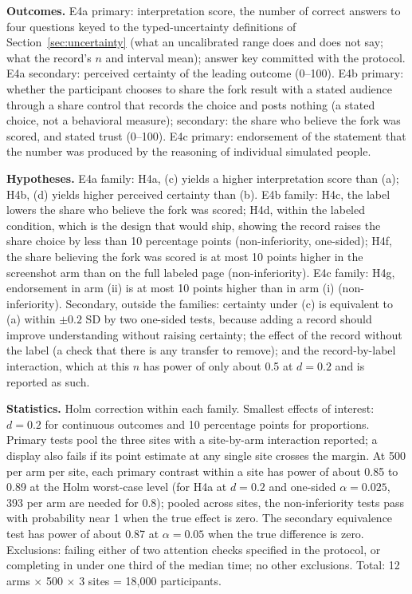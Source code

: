 \documentclass[11pt]{article}
\begin{document}
\textbf{Outcomes.} E4a primary: interpretation score, the number of correct answers to four questions keyed to the typed-uncertainty definitions of Section~\ref{sec:uncertainty} (what an uncalibrated range does and does not say; what the record's $n$ and interval mean); answer key committed with the protocol. E4a secondary: perceived certainty of the leading outcome (0--100). E4b primary: whether the participant chooses to share the fork result with a stated audience through a share control that records the choice and posts nothing (a stated choice, not a behavioral measure); secondary: the share who believe the fork was scored, and stated trust (0--100). E4c primary: endorsement of the statement that the number was produced by the reasoning of individual simulated people.

\textbf{Hypotheses.} E4a family: H4a, (c) yields a higher interpretation score than (a); H4b, (d) yields higher perceived certainty than (b). E4b family: H4c, the label lowers the share who believe the fork was scored; H4d, within the labeled condition, which is the design that would ship, showing the record raises the share choice by less than 10 percentage points (non-inferiority, one-sided); H4f, the share believing the fork was scored is at most 10 points higher in the screenshot arm than on the full labeled page (non-inferiority). E4c family: H4g, endorsement in arm (ii) is at most 10 points higher than in arm (i) (non-inferiority). Secondary, outside the families: certainty under (c) is equivalent to (a) within $\pm 0.2$ SD by two one-sided tests, because adding a record should improve understanding without raising certainty; the effect of the record without the label (a check that there is any transfer to remove); and the record-by-label interaction, which at this $n$ has power of only about 0.5 at $d=0.2$ and is reported as such.

\textbf{Statistics.} Holm correction within each family. Smallest effects of interest: $d=0.2$ for continuous outcomes and 10 percentage points for proportions. Primary tests pool the three sites with a site-by-arm interaction reported; a display also fails if its point estimate at any single site crosses the margin. At 500 per arm per site, each primary contrast within a site has power of about 0.85 to 0.89 at the Holm worst-case level (for H4a at $d=0.2$ and one-sided $\alpha=0.025$, 393 per arm are needed for 0.8); pooled across sites, the non-inferiority tests pass with probability near 1 when the true effect is zero. The secondary equivalence test has power of about 0.87 at $\alpha=0.05$ when the true difference is zero. Exclusions: failing either of two attention checks specified in the protocol, or completing in under one third of the median time; no other exclusions. Total: 12 arms $\times$ 500 $\times$ 3 sites = 18,000 participants.
\end{document}
